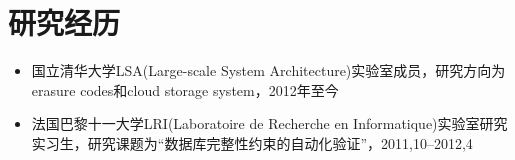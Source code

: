 \documentclass[letterpaper]{article}
\begin{document}

\section*{研究经历}

\begin{itemize}
\item 国立清华大学LSA(Large-scale System Architecture)实验室成员，研究方向为erasure codes和cloud storage system，2012年至今
\item 法国巴黎十一大学LRI(Laboratoire de Recherche en Informatique)实验室研究实习生，研究课题为“数据库完整性约束的自动化验证”，2011,10--2012,4

\end{itemize}
\end{document}
